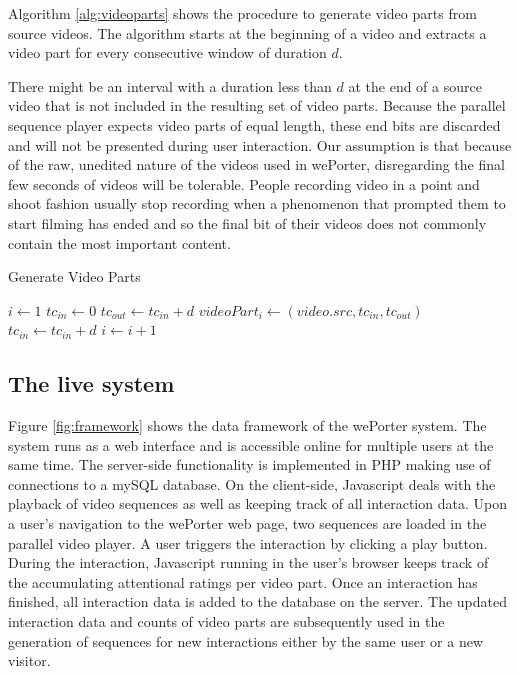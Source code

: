 Algorithm \ref{alg:videoparts} shows the procedure to generate video parts from source videos. The algorithm starts at the beginning of a video and extracts a video part for every consecutive window of duration $d$. 

There might be an interval with a duration less than $d$ at the end of a source video that is not included in the resulting set of video parts. Because the parallel sequence player expects video parts of equal length, these end bits are discarded and will not be presented during user interaction. Our assumption is that because of the raw, unedited nature of the videos used in wePorter, disregarding the final few seconds of videos will be tolerable. People recording video in a point and shoot fashion usually stop recording when a phenomenon that prompted them to start filming has ended and so the final bit of their videos does not commonly contain the most important content.

\begin{algorithm}
  \caption{Generate Video Parts}
  \begin{algorithmic}[1]
      \State $i\gets 1$
        \State $tc_{in} \gets 0$
          \State $tc_{out} \gets tc_{in}+d$
          \State $videoPart_i \gets (video.src, tc_{in}, tc_{out})$ 
          \State $tc_{in} \gets tc_{in}+d$
          \State $i \gets i+1$
        \EndWhile
      \EndFor
    \EndProcedure
  \end{algorithmic}
  \label{alg:videoparts}
\end{algorithm}

\subsection{The live system}

Figure \ref{fig:framework} shows the data framework of the wePorter system. The system runs as a web interface and is accessible online for multiple users at the same time. The server-side functionality is implemented in PHP making use of connections to a mySQL database. On the client-side, Javascript deals with the playback of video sequences as well as keeping track of all interaction data. Upon a user's navigation to the wePorter web page, two sequences are loaded in the parallel video player. A user triggers the interaction by clicking a play button. During the interaction, Javascript running in the user's browser keeps track of the accumulating attentional ratings per video part. Once an interaction has finished, all interaction data is added to the database on the server. The updated interaction data and counts of video parts are subsequently used in the generation of sequences for new interactions either by the same user or a new visitor.

